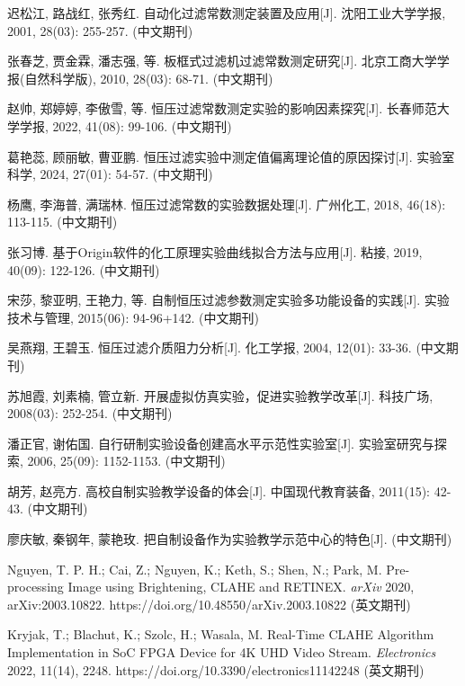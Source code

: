 
\pagebreak{}

{\liuhao

\begin{thebibliography}{99}   %

     迟松江, 路战红, 张秀红. 自动化过滤常数测定装置及应用[J]. 沈阳工业大学学报, 2001, 28(03): 255-257.	(中文期刊)

     张春芝, 贾金霖, 潘志强, 等. 板框式过滤机过滤常数测定研究[J]. 北京工商大学学报(自然科学版), 2010, 28(03): 68-71.	(中文期刊)

     赵帅, 郑婷婷, 李傲雪, 等. 恒压过滤常数测定实验的影响因素探究[J]. 长春师范大学学报, 2022, 41(08): 99-106.	(中文期刊)

     葛艳蕊, 顾丽敏, 曹亚鹏. 恒压过滤实验中测定值偏离理论值的原因探讨[J]. 实验室科学, 2024, 27(01): 54-57.	(中文期刊)

     杨鹰, 李海普, 满瑞林. 恒压过滤常数的实验数据处理[J]. 广州化工, 2018, 46(18): 113-115.	(中文期刊)

     张习博. 基于Origin软件的化工原理实验曲线拟合方法与应用[J]. 粘接, 2019, 40(09): 122-126.	(中文期刊)

     宋莎, 黎亚明, 王艳力, 等. 自制恒压过滤参数测定实验多功能设备的实践[J]. 实验技术与管理, 2015(06): 94-96+142.	(中文期刊)

     吴燕翔, 王碧玉. 恒压过滤介质阻力分析[J]. 化工学报, 2004, 12(01): 33-36.	(中文期刊)

     苏旭霞, 刘素楠, 管立新. 开展虚拟仿真实验，促进实验教学改革[J]. 科技广场, 2008(03): 252-254.	(中文期刊)

     潘正官, 谢佑国. 自行研制实验设备创建高水平示范性实验室[J]. 实验室研究与探索, 2006, 25(09): 1152-1153.	(中文期刊)

     胡芳, 赵亮方. 高校自制实验教学设备的体会[J]. 中国现代教育装备, 2011(15): 42-43.	(中文期刊)

     廖庆敏, 秦钢年, 蒙艳玫. 把自制设备作为实验教学示范中心的特色[J].	(中文期刊)

     Nguyen, T. P. H.; Cai, Z.; Nguyen, K.; Keth, S.; Shen, N.; Park, M. Pre-processing Image using Brightening, CLAHE and RETINEX. \textit{arXiv} 2020, arXiv:2003.10822. https://doi.org/10.48550/arXiv.2003.10822	(英文期刊)

     Kryjak, T.; Blachut, K.; Szolc, H.; Wasala, M. Real-Time CLAHE Algorithm Implementation in SoC FPGA Device for 4K UHD Video Stream. \textit{Electronics} 2022, 11(14), 2248. https://doi.org/10.3390/electronics11142248	(英文期刊)


\end{thebibliography}}

